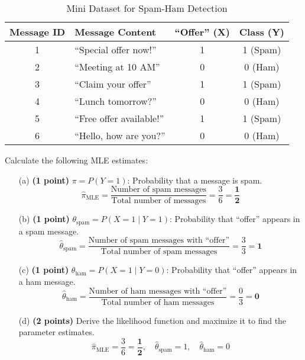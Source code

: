 \documentclass{article}
\begin{document}
\begin{table}[h!]
    \centering
    \begin{tabular}{|c|l|c|c|}
        \hline
        \textbf{Message ID} & \textbf{Message Content} & \textbf{``Offer'' (X)} & \textbf{Class (Y)} \\
        \hline
        1 & ``Special offer now!'' & 1 & 1 (Spam) \\
        2 & ``Meeting at 10 AM'' & 0 & 0 (Ham) \\
        3 & ``Claim your offer'' & 1 & 1 (Spam) \\
        4 & ``Lunch tomorrow?'' & 0 & 0 (Ham) \\
        5 & ``Free offer available!'' & 1 & 1 (Spam) \\
        6 & ``Hello, how are you?'' & 0 & 0 (Ham) \\
        \hline
    \end{tabular}
    \caption{Mini Dataset for Spam-Ham Detection}
\end{table}

\noindent Calculate the following MLE estimates:
\begin{itemize}
    \item[(a)] \textbf{(1 point)} $\pi = P(Y = 1)$: Probability that a message is spam.
    \[
    \hat{\pi}_{\text{MLE}} = \frac{\text{Number of spam messages}}{\text{Total number of messages}} = \frac{3}{6} = \mathbf{\frac{1}{2}}
    \]
    \item[(b)] \textbf{(1 point)} $\theta_{\text{spam}} = P(X = 1 \mid Y = 1)$: Probability that ``offer'' appears in a spam message.
    \[
    \hat{\theta}_{\text{spam}} = \frac{\text{Number of spam messages with ``offer''}}{\text{Total number of spam messages}} = \frac{3}{3} = \mathbf{1}
    \]
    \item[(c)] \textbf{(1 point)} $\theta_{\text{ham}} = P(X = 1 \mid Y = 0)$: Probability that ``offer'' appears in a ham message.
    \[
    \hat{\theta}_{\text{ham}} = \frac{\text{Number of ham messages with ``offer''}}{\text{Total number of ham messages}} = \frac{0}{3} = \mathbf{0}
    \]
    \item[(d)] \textbf{(2 points)} Derive the likelihood function and maximize it to find the parameter estimates. 
    \[
    \hat{\pi}_{\text{MLE}} = \frac{3}{6} = \mathbf{\frac{1}{2}}, \quad \hat{\theta}_{\text{spam}} = 1, \quad \hat{\theta}_{\text{ham}} = 0
    \]
\end{itemize}
\end{document}
